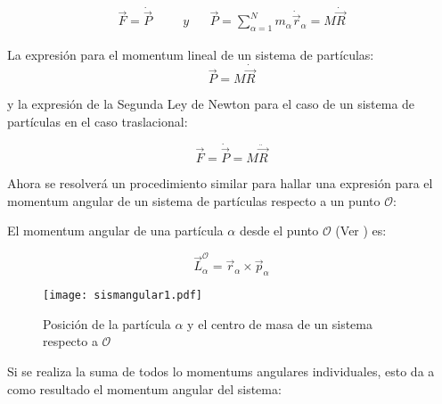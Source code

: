 \documentclass[/home/hernan-barquero/Documents/Apuntes_mecanica_teorica/main.tex]{subfiles}
\begin{document}
		\begin{align*}
			\vec{F} = \dot{\vec{P}} \; \; \; \; \; \; &y \; \; \; \; \; \; \vec{P} = \sum_{\alpha = 1}^{N} m_{\alpha} \dot{\vec{r}}_{\alpha} = M\dot{\vec{R}}
		\end{align*}

    \begin{definition} 
		La expresión para el momentum lineal de un sistema de partículas:
		\begin{equation}
			\vec{P} = M\dot{\vec{R}}
			\label{eq: sismomentuml}
		\end{equation}

		y la expresión de la Segunda Ley de Newton para el caso de un sistema de partículas en el caso traslacional:

		\begin{equation}
			\vec{F} = \dot{\vec{P}} = M \ddot{\vec{R}}
			\label{eq: sisNSecondlaw}
		\end{equation}
    \end{definition}

	\newpage

	Ahora se resolverá un procedimiento similar para hallar una expresión para el momentum angular de un sistema de partículas respecto a un punto $\mathcal{O}$:

	El momentum angular de una partícula $\alpha$ desde el punto $\mathcal{O}$ (Ver ) es: 

	\begin{equation*}
		\vec{L}_{\alpha}^{\mathcal{O}} = \vec{r}_{\alpha} \times \vec{p}_{\alpha}
	\end{equation*}

	\begin{marginfigure}
		\begin{figure}[H]
			\texttt{[image: sismangular1.pdf]}
			\caption{Posición de la partícula $\alpha$ y el centro de masa de un sistema respecto a $\mathcal{O}$}
			\label{fig: sismangular1}
		\end{figure}
	\end{marginfigure}

	Si se realiza la suma de todos lo momentums angulares individuales, esto da a como resultado el momentum angular del sistema:
\end{document}
